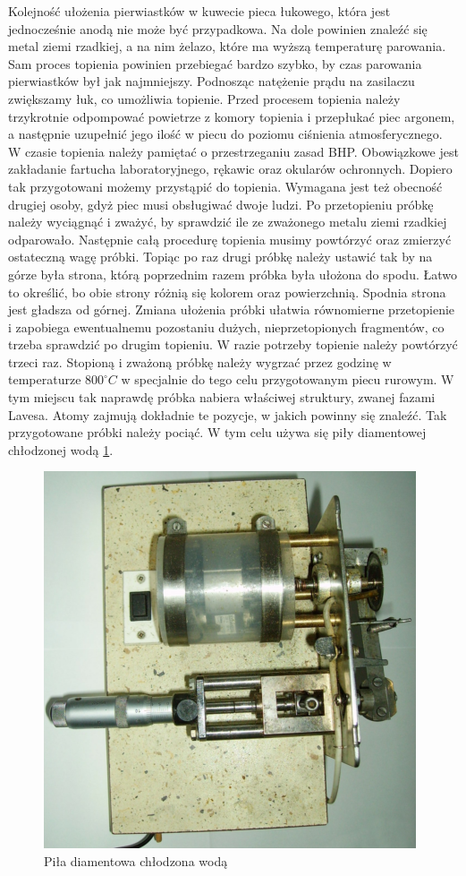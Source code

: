 \documentclass[a4paper,12pt]{article}
\numberwithin{equation}{section}
\begin{document}
Kolejność ułożenia pierwiastków w kuwecie pieca łukowego, która jest 
jednocześnie anodą nie może być przypadkowa. Na dole powinien znaleźć się metal ziemi rzadkiej, a na nim 
żelazo, które ma wyższą temperaturę parowania. Sam proces topienia powinien przebiegać bardzo szybko, by 
czas parowania pierwiastków był jak najmniejszy.  Podnosząc natężenie prądu na zasilaczu zwiększamy 
łuk, co umożliwia topienie. Przed procesem topienia należy trzykrotnie odpompować powietrze z komory topienia  i przepłukać 
piec argonem, a następnie uzupełnić jego ilość w piecu do poziomu ciśnienia atmosferycznego. W czasie 
topienia należy pamiętać o przestrzeganiu zasad BHP. Obowiązkowe jest zakładanie fartucha laboratoryjnego, 
rękawic oraz okularów ochronnych. Dopiero tak przygotowani możemy przystąpić do topienia. Wymagana jest 
też obecność drugiej osoby, gdyż piec musi obsługiwać dwoje ludzi. Po przetopieniu próbkę należy wyciągnąć i 
zważyć, by sprawdzić ile ze zważonego metalu ziemi rzadkiej odparowało. Następnie całą procedurę topienia 
musimy powtórzyć oraz zmierzyć ostateczną wagę próbki. Topiąc po raz drugi próbkę należy ustawić tak by 
na górze była strona, którą poprzednim razem próbka była ułożona do spodu. Łatwo to określić, bo obie 
strony różnią się kolorem oraz powierzchnią. Spodnia strona jest gładsza od górnej. Zmiana ułożenia próbki 
ułatwia równomierne przetopienie i zapobiega ewentualnemu pozostaniu dużych, nieprzetopionych 
fragmentów, co trzeba sprawdzić po drugim topieniu. W razie potrzeby topienie należy powtórzyć trzeci raz. 
Stopioną i zważoną próbkę należy wygrzać przez godzinę w temperaturze $800^{\circ}C$ w specjalnie do tego celu 
przygotowanym piecu rurowym. W tym miejscu tak naprawdę próbka nabiera właściwej struktury, zwanej 
fazami Lavesa. %
 Atomy zajmują dokładnie te pozycje, w jakich powinny się znaleźć. Tak przygotowane próbki 
należy pociąć. W tym celu używa się piły diamentowej chłodzonej wodą \ref{fig:pila}.

\begin{figure}[h]
\centerline{\includegraphics[scale=1]{../img/pila}}
\caption{Piła diamentowa chłodzona wodą}
\label{fig:pila}
\end{figure}
\end{document}
